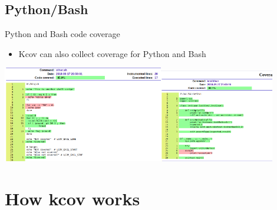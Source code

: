 \documentclass{beamer}
\begin{document}
\subsection{Python/Bash}
\begin{frame}{Python and Bash code coverage}
  \begin{itemize}
    \item Kcov can also collect coverage for Python and Bash
  \end{itemize}

  \includegraphics[width=7cm]{bash}\includegraphics[width=5cm]{python}
\end{frame}

\section{How kcov works}
\end{document}
